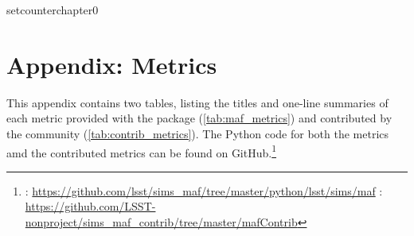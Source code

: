 setcounter{chapter}{0}
\chapter*{Appendix: \MAF Metrics}
\def\chpname{metrics}\label{chp:\chpname}
\markboth{}{}

This appendix contains two tables, listing the titles and one-line summaries of each metric provided with the \MAF package (\autoref{tab:maf_metrics}) and contributed by the community (\autoref{tab:contrib_metrics}). The Python code for both the \MAF metrics amd the contributed metrics can be found on GitHub.\footnote{\MAF: \url{https://github.com/lsst/sims_maf/tree/master/python/lsst/sims/maf}
\newline\noindent{}: \url{https://github.com/LSST-nonproject/sims\_maf\_contrib/tree/master/mafContrib}}




